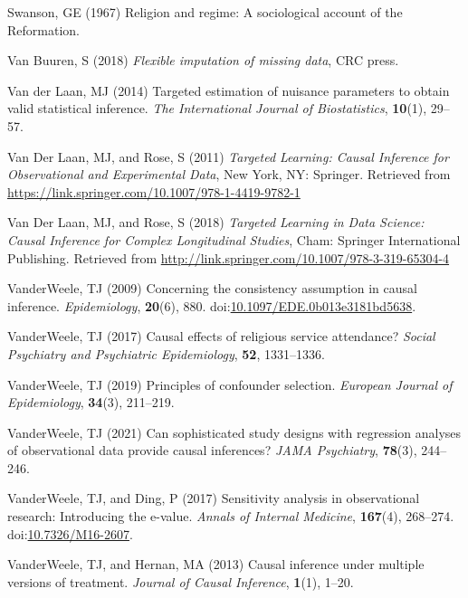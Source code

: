 \documentclass[
  single column]{article}
\newlength{\cslhangindent}
\newenvironment{CSLReferences}[2] %
 {\begin{list}{}{%
  \setlength{\itemindent}{0pt}
  \setlength{\leftmargin}{0pt}
  \setlength{\parsep}{0pt}
  \ifodd #1
   \setlength{\leftmargin}{\cslhangindent}
   \setlength{\itemindent}{-1\cslhangindent}
  \fi
  \setlength{\itemsep}{#2\baselineskip}}}
 {\end{list}}
\begin{document}
\begin{CSLReferences}{1}{0}
Swanson, GE (1967) Religion and regime: A sociological account of the
{R}eformation.

Van Buuren, S (2018) \emph{Flexible imputation of missing data}, CRC
press.

Van der Laan, MJ (2014) Targeted estimation of nuisance parameters to
obtain valid statistical inference. \emph{The International Journal of
Biostatistics}, \textbf{10}(1), 29--57.

Van Der Laan, MJ, and Rose, S (2011) \emph{Targeted Learning: Causal
Inference for Observational and Experimental Data}, New York, NY:
Springer. Retrieved from
\url{https://link.springer.com/10.1007/978-1-4419-9782-1}

Van Der Laan, MJ, and Rose, S (2018) \emph{Targeted Learning in Data
Science: Causal Inference for Complex Longitudinal Studies}, Cham:
Springer International Publishing. Retrieved from
\url{http://link.springer.com/10.1007/978-3-319-65304-4}

VanderWeele, TJ (2009) Concerning the consistency assumption in causal
inference. \emph{Epidemiology}, \textbf{20}(6), 880.
doi:\href{https://doi.org/10.1097/EDE.0b013e3181bd5638}{10.1097/EDE.0b013e3181bd5638}.

VanderWeele, TJ (2017) Causal effects of religious service attendance?
\emph{Social Psychiatry and Psychiatric Epidemiology}, \textbf{52},
1331--1336.

VanderWeele, TJ (2019) Principles of confounder selection.
\emph{European Journal of Epidemiology}, \textbf{34}(3), 211--219.

VanderWeele, TJ (2021) Can sophisticated study designs with regression
analyses of observational data provide causal inferences? \emph{JAMA
Psychiatry}, \textbf{78}(3), 244--246.

VanderWeele, TJ, and Ding, P (2017) Sensitivity analysis in
observational research: Introducing the e-value. \emph{Annals of
Internal Medicine}, \textbf{167}(4), 268--274.
doi:\href{https://doi.org/10.7326/M16-2607}{10.7326/M16-2607}.

VanderWeele, TJ, and Hernan, MA (2013) Causal inference under multiple
versions of treatment. \emph{Journal of Causal Inference},
\textbf{1}(1), 1--20.


\end{CSLReferences}
\end{document}
